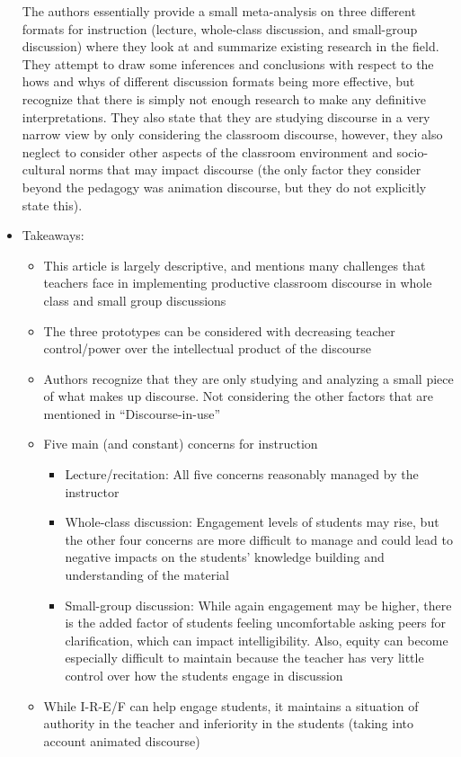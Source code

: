 \documentclass{TC}
\begin{document}
\begin{itemize}
The authors essentially provide a small meta-analysis on three different formats for instruction (lecture, whole-class discussion, and small-group discussion) where they look at and summarize existing research in the field. They attempt to draw some inferences and conclusions with respect to the hows and whys of different discussion formats being more effective, but recognize that there is simply not enough research to make any definitive interpretations. They also state that they are studying discourse in a very narrow view by only considering the classroom discourse, however, they also neglect to consider other aspects of the classroom environment and socio-cultural norms that may impact discourse (the only factor they consider beyond the pedagogy was animation discourse, but they do not explicitly state this).
\item Takeaways:
	\begin{itemize}
	\item This article is largely descriptive, and mentions many challenges that teachers face in implementing productive classroom discourse in whole class and small group discussions
	\item The three prototypes can be considered with decreasing teacher control/power over the intellectual product of the discourse
	\item Authors recognize that they are only studying and analyzing a small piece of what makes up discourse. Not considering the other factors that are mentioned in “Discourse-in-use”
	\item Five main (and constant) concerns for instruction
		\begin{itemize}
		\item Lecture/recitation: All five concerns reasonably managed by the instructor
		\item Whole-class discussion: Engagement levels of students may rise, but the other four concerns are more difficult to manage and could lead to negative impacts on the students’ knowledge building and understanding of the material
		\item Small-group discussion: While again engagement may be higher, there is the added factor of students feeling uncomfortable asking peers for clarification, which can impact intelligibility. Also, equity can become especially difficult to maintain because the teacher has very little control over how the students engage in discussion
		\end{itemize}
	\item While I-R-E/F can help engage students, it maintains a situation of authority in the teacher and inferiority in the students (taking into account animated discourse)

\end{itemize}
\end{itemize}
\end{document}
